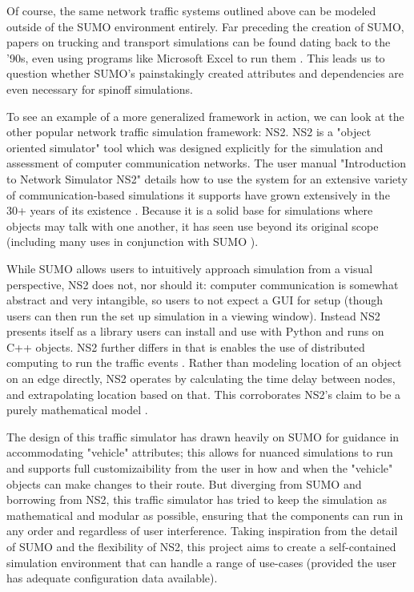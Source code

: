 \par Of course, the same network traffic systems outlined above can be modeled outside of the SUMO environment entirely.  Far preceding the creation of SUMO, papers on trucking and transport simulations can be found dating back to the '90s, even using programs like Microsoft Excel to run them \cite{Dag94}. This leads us to question whether SUMO's painstakingly created attributes and dependencies are even necessary for spinoff simulations. \\

\par To see an example of a more generalized framework in action, we can look at the other popular network traffic simulation framework:  NS2.  NS2 is a "object oriented simulator" tool which was designed explicitly for the simulation and assessment of computer communication networks.  The user manual "Introduction to Network Simulator NS2" details how to use the system for an extensive variety of communication-based simulations it supports have grown extensively in the 30+ years of its existence \cite{IH11}.  Because it is a solid base for simulations where objects may talk with one another, it has seen use beyond its original scope (including many uses in conjunction with SUMO \cite{LWB18}). \\

\par While SUMO allows users to intuitively approach simulation from a visual perspective, NS2 does not, nor should it:  computer communication is somewhat abstract and very intangible, so users to not expect a GUI for setup (though users can then run the set up simulation in a viewing window).  Instead NS2 presents itself as a library users can install and use with Python and runs on C++ objects.  NS2 further differs in that is enables the use of distributed computing to run the traffic events \cite{IH11}.  Rather than modeling location of an object on an edge directly, NS2 operates by calculating the time delay between nodes, and extrapolating location based on that. This corroborates NS2's claim to be a purely mathematical model \cite{IH11}.  \\

\par The design of this traffic simulator has drawn heavily on SUMO for guidance in accommodating "vehicle" attributes; this allows for nuanced simulations to run and supports full customizaibility from the user in how and when the "vehicle" objects can make changes to their route.  But diverging from SUMO and borrowing from NS2, this traffic simulator has tried to keep the simulation as mathematical and modular as possible, ensuring that the components can run in any order and regardless of user interference.  Taking inspiration from the detail of SUMO and the flexibility of NS2, this project aims to create a self-contained simulation environment that can handle a range of use-cases (provided the user has adequate configuration data available).  